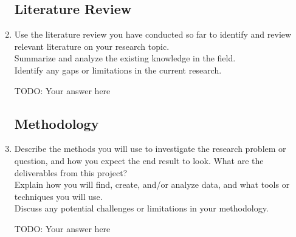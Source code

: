 \documentclass[letterpaper,11pt]{article}
\begin{document}
\begin{enumerate}
\subsection{Literature Review}
\item
Use the literature review you have conducted so far to identify and review relevant literature on your research topic. \\ 
Summarize and analyze the existing knowledge in the field. \\
Identify any gaps or limitations in the current research.
\begin{tcolorbox}
TODO: Your answer here
\newline
\newline
\newline
\newline
\newline
\newline
\newline
\newline
\newline
\end{tcolorbox}

\subsection{Methodology}
\item
    Describe the methods you will use to investigate the research problem or question, and how you expect the end result to look. What are the deliverables from this project? \\ 
    Explain how you will find, create, and/or analyze data, and what tools or techniques you will use. \\ 
    Discuss any potential challenges or limitations in your methodology. \\ 
\begin{tcolorbox}
TODO: Your answer here
\newline
\newline
\newline
\newline
\newline
\newline
\newline
\newline
\newline
\end{tcolorbox}


\end{enumerate}
\end{document}
